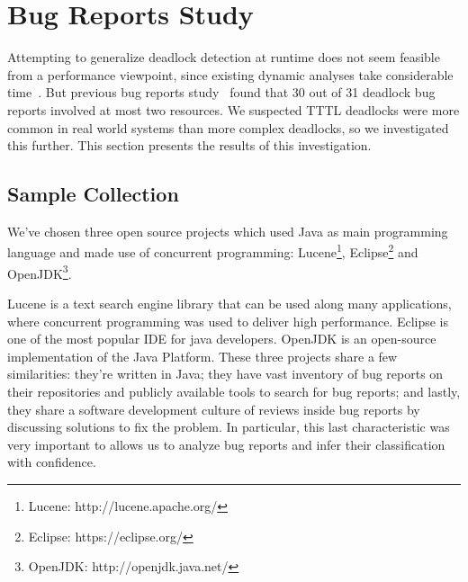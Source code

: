 \section{Bug Reports Study}\label{bugs}

Attempting to generalize deadlock detection at runtime does not seem feasible from a performance viewpoint, since existing dynamic analyses take considerable time~\cite{magicfuzzer}. But previous bug reports study~\cite{lu} found that 30 out of 31 deadlock bug reports involved at most two resources. We suspected TTTL deadlocks were more common in real world systems than more complex deadlocks, so we investigated this further. This section presents the results of this investigation.

\subsection{Sample Collection}

We've chosen three open source projects which used Java as main programming language and made use of concurrent programming: Lucene\footnote{Lucene: http://lucene.apache.org/}, Eclipse\footnote{Eclipse: https://eclipse.org/} and OpenJDK\footnote{OpenJDK: http://openjdk.java.net/}.

Lucene is a text search engine library that can be used along many applications, where concurrent programming was used to deliver high performance. Eclipse is one of the most popular IDE for java developers. OpenJDK is an open-source implementation of the Java Platform. These three projects share a few similarities: they're written in Java; they have vast inventory of bug reports on their repositories and publicly available tools to search for bug reports; and lastly, they share a software development culture of reviews inside bug reports by discussing solutions to fix the problem. In particular, this last characteristic was very important to allows us to analyze bug reports and infer their classification with confidence.

